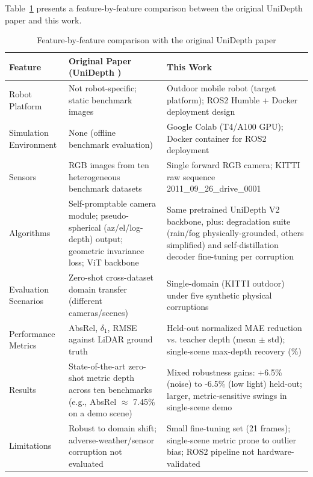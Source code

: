 \documentclass[conference]{IEEEtran}
\begin{document}
Table~\ref{tab:comparison} presents a feature-by-feature comparison between the original UniDepth paper and this work.

\begin{table}[!t]
\caption{Feature-by-feature comparison with the original UniDepth paper}
\label{tab:comparison}
\centering
\begin{tabular}{p{2.4cm}p{5.6cm}p{5.6cm}}
\toprule
\textbf{Feature} & \textbf{Original Paper (UniDepth \cite{ref1})} & \textbf{This Work} \\
\midrule
Robot Platform & Not robot-specific; static benchmark images & Outdoor mobile robot (target platform); ROS2 Humble + Docker deployment design \\
\addlinespace
Simulation Environment & None (offline benchmark evaluation) & Google Colab (T4/A100 GPU); Docker container for ROS2 deployment \\
\addlinespace
Sensors & RGB images from ten heterogeneous benchmark datasets & Single forward RGB camera; KITTI raw sequence 2011\_09\_26\_drive\_0001 \\
\addlinespace
Algorithms & Self-promptable camera module; pseudo-spherical (az/el/log-depth) output; geometric invariance loss; ViT backbone & Same pretrained UniDepth V2 backbone, plus: degradation suite (rain/fog physically-grounded, others simplified) and self-distillation decoder fine-tuning per corruption \\
\addlinespace
Evaluation Scenarios & Zero-shot cross-dataset domain transfer (different cameras/scenes) & Single-domain (KITTI outdoor) under five synthetic physical corruptions \\
\addlinespace
Performance Metrics & AbsRel, $\delta_1$, RMSE against LiDAR ground truth & Held-out normalized MAE reduction vs. teacher depth (mean $\pm$ std); single-scene max-depth recovery (\%) \\
\addlinespace
Results & State-of-the-art zero-shot metric depth across ten benchmarks (e.g., AbsRel $\approx$ 7.45\% on a demo scene) & Mixed robustness gains: +6.5\% (noise) to -6.5\% (low light) held-out; larger, metric-sensitive swings in single-scene demo \\
\addlinespace
Limitations & Robust to domain shift; adverse-weather/sensor corruption not evaluated & Small fine-tuning set (21 frames); single-scene metric prone to outlier bias; ROS2 pipeline not hardware-validated \\
\bottomrule
\end{tabular}
\end{table}
\end{document}
